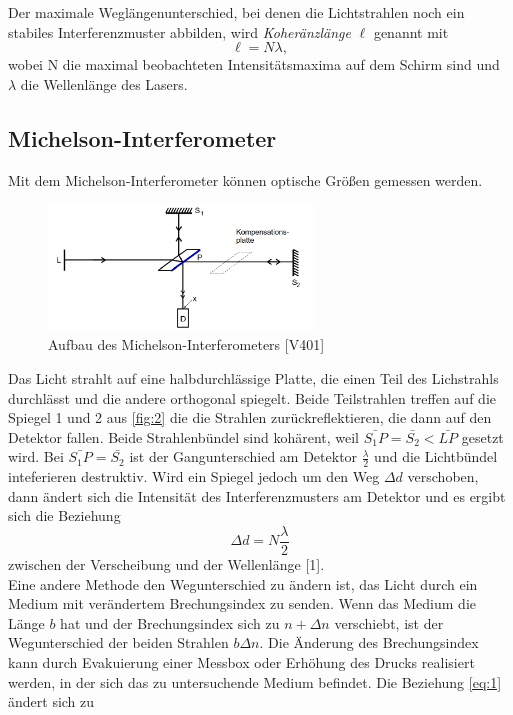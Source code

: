 Der maximale Weglängenunterschied, bei denen die Lichtstrahlen noch ein stabiles Interferenzmuster abbilden, wird \textit{Koheränzlänge} $\ell$ genannt mit
\begin{equation}
  \ell=N\lambda, \nonumber
\end{equation}
wobei N die maximal beobachteten Intensitätsmaxima auf dem Schirm sind und $\lambda$ die Wellenlänge des Lasers.

\subsection{Michelson-Interferometer}

Mit dem Michelson-Interferometer können optische Größen gemessen werden. 
\begin{figure}[H]
  \centering
  \includegraphics[width=7cm]{2}
  \caption{Aufbau des Michelson-Interferometers [V401]}
  \label{fig:2}
\end{figure}
Das Licht strahlt auf eine halbdurchlässige Platte, die einen Teil des Lichstrahls durchlässt und die andere orthogonal spiegelt. Beide Teilstrahlen treffen auf die Spiegel 1 und 2 aus \autoref{fig:2} die die Strahlen zurückreflektieren, die dann auf den Detektor fallen. Beide Strahlenbündel sind kohärent, weil $\bar{S_{1}P}=\bar{S_{2}}<\bar{LP}$ gesetzt wird. Bei $\bar{S_{1}P}=\bar{S_{2}}$ ist der Gangunterschied am Detektor $\frac{\lambda}{2}$ und die Lichtbündel inteferieren destruktiv. Wird ein Spiegel jedoch um den Weg $\Delta d$ verschoben, dann ändert sich die Intensität des Interferenzmusters am Detektor und es ergibt sich die Beziehung
\begin{equation}
  \Delta d=N\frac{\lambda}{2}
  \label{eq:1}
\end{equation}
zwischen der Verscheibung und der Wellenlänge [1].\\
Eine andere Methode den Wegunterschied zu ändern ist, das Licht durch ein Medium mit verändertem Brechungsindex zu senden. Wenn das Medium die Länge $b$ hat und der Brechungsindex sich zu $n+\Delta n$ verschiebt, ist der Wegunterschied der beiden Strahlen $b\Delta n$. Die Änderung des Brechungsindex kann durch Evakuierung einer Messbox oder Erhöhung des Drucks realisiert werden, in der sich das zu untersuchende Medium befindet. Die Beziehung \eqref{eq:1} ändert sich zu
